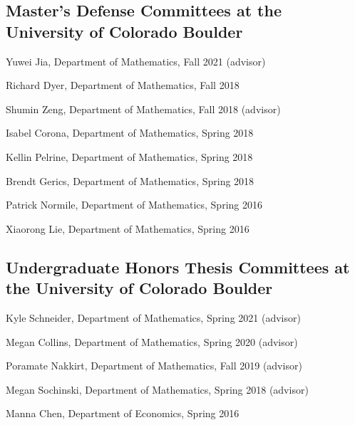 \documentclass[letterpaper]{article}
\renewenvironment{itemize}{
  \begin{list}{}{
    \setlength{\leftmargin}{1em}
  }
}{
  \end{list}
}
\begin{document}
\subsection*{Master's Defense Committees at the University of Colorado Boulder} 
\begin{itemize}
	\item Yuwei Jia, Department of Mathematics, Fall 2021 (advisor)
	\item Richard Dyer, Department of Mathematics, Fall 2018 
	\item Shumin Zeng, Department of Mathematics, Fall 2018 (advisor) 
	\item Isabel Corona, Department of Mathematics, Spring 2018 
	\item Kellin Pelrine, Department of Mathematics, Spring 2018 
	\item Brendt Gerics, Department of Mathematics, Spring 2018
	\item Patrick Normile, Department of Mathematics, Spring 2016 
	\item Xiaorong Lie, Department of Mathematics, Spring 2016 
\end{itemize}

\subsection*{Undergraduate Honors Thesis Committees at the University of Colorado Boulder} 
\begin{itemize}
	\item Kyle Schneider, Department of Mathematics, Spring 2021 (advisor)
	\item Megan Collins, Department of Mathematics, Spring 2020 (advisor)
	\item Poramate Nakkirt, Department of Mathematics, Fall 2019 (advisor)
	\item Megan Sochinski, Department of Mathematics, Spring 2018 (advisor)
	\item Manna Chen, Department of Economics, Spring 2016 
\end{itemize}
\end{document}
